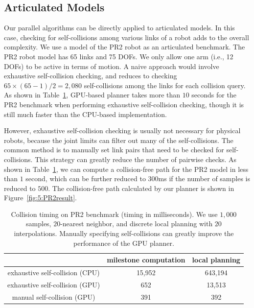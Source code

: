 \subsection{Articulated Models}
Our parallel algorithms can be directly applied to articulated models. In this case, checking for self-collisions among
various links of a robot adds to the overall complexity. We use a model of the PR2 robot as an articulated
benchmark. The PR2 robot model has 65 links and 75 DOFs. We only allow one arm (i.e., 12 DOFs) to be active in terms
of motion. A naive approach would involve exhaustive self-collision checking, and reduces to checking
$65 \times (65-1)/2 = 2,080$ self-collisions among the links for each collision query.
As shown in Table~\ref{tab:5:selfcollision}, GPU-based planner takes more than $10$ seconds for the PR2 benchmark when
performing exhaustive self-collision checking, though it is still much faster than the CPU-based implementation.

However, exhaustive self-collision checking is usually not necessary for  physical robots, because the joint limits can
filter out many of the self-collisions. The common method is to manually set link pairs that need to be checked
for self-collisions. This strategy can greatly reduce the number of pairwise checks. As shown in Table~\ref{tab:5:selfcollision}, we can compute a collision-free path for the PR2 model in less than $1$ second, which can be further reduced to $300$ms if
the number of samples is reduced to $500$. The collision-free path calculated by our planner is shown in Figure~\ref{fig:5:PR2result}.


\begin{table}[htb]
\begin{center}
\begin{tabular}{|c|c|c|} \hline
                                & milestone computation & local planning \\ \hline
exhaustive self-collision (CPU) & 15,952 & 643,194 \\ \hline
exhaustive self-collision (GPU) & 652 & 13,513 \\ \hline
manual self-collision (GPU) & 391 & 392 \\ \hline
\end{tabular}
\end{center}
\caption[Comparison of the collision timing on PR2 benchmark when using CPU-based and GPU-based collision checking algorithms]{Collision timing on PR2 benchmark (timing in milliseconds). We use $1,000$ samples, $20$-nearest neighbor, and discrete local planning with $20$ interpolations. Manually specifying self-collisions can greatly improve the performance of the GPU planner. }\label{tab:5:selfcollision}
\end{table}


